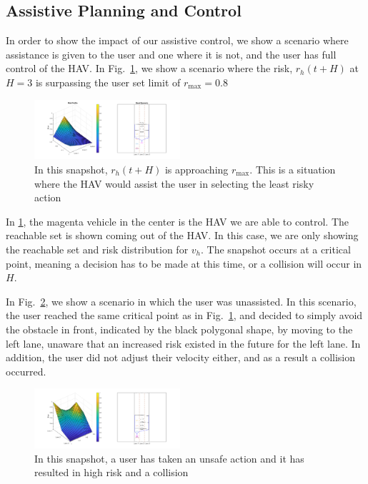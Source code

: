 \documentclass[letterpaper, 10 pt, conference]{ieeeconf}  %
\begin{document}
 
\subsection{Assistive Planning and Control}
In order to show the impact of our assistive control, we show a scenario where assistance is given to the user and one where it is not, and the user has full control of the HAV. In Fig.~\ref{fig:critpt}, we show a scenario where the risk, $r_h(t+H)$ at $H=3$ is surpassing the user set limit of $r_\max = 0.8$


\begin{figure}[ht]
    \includegraphics[width=0.48\textwidth]{critpt.png}
    \caption{In this snapshot, $r_h(t+H)$ is approaching $r_\max$. This is a situation where the HAV would assist the user in selecting the least risky action}
    \label{fig:critpt}
\end{figure}

In \ref{fig:critpt}, the magenta vehicle in the center is the HAV we are able to control. The reachable set is shown coming out of the HAV. In this case, we are only showing the reachable set and risk distribution for $v_h$. The snapshot occurs at a critical point, meaning a decision has to be made at this time, or a collision will occur in $H$. 


In Fig.~\ref{fig:noassist}, we show a scenario in which the user was unassisted. In this scenario, the user reached the same critical point as in Fig.~\ref{fig:critpt}, and decided to simply avoid the obstacle in front, indicated by the black polygonal shape, by moving to the left lane, unaware that an increased risk existed in the future for the left lane. In addition, the user did not adjust their velocity either, and as a result a collision occurred.

\begin{figure}[ht]
    \includegraphics[width=0.48\textwidth]{noassist.png}
    \caption{In this snapshot, a user has taken an unsafe action and it has resulted in high risk and a collision}
    \label{fig:noassist}
\end{figure}
\end{document}
